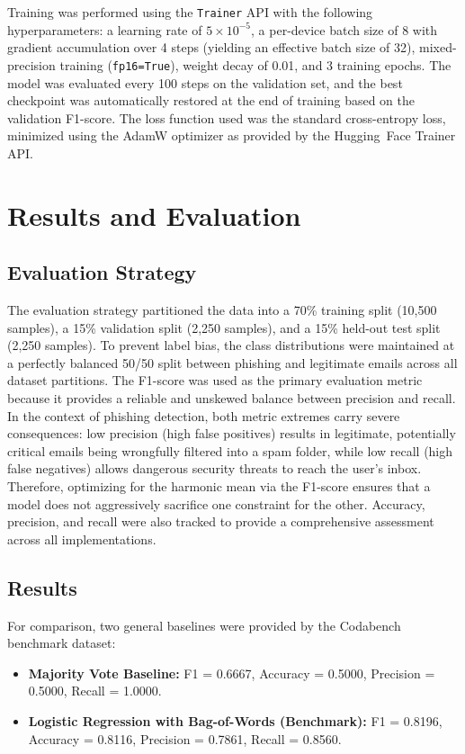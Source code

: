 \documentclass[11pt]{article}
\begin{document}
Training was performed using the \texttt{Trainer} API with the following hyperparameters: a learning rate of $5 \times 10^{-5}$, a per-device batch size of 8 with gradient accumulation over 4 steps (yielding an effective batch size of 32), mixed-precision training (\texttt{fp16=True}), weight decay of 0.01, and 3 training epochs. The model was evaluated every 100 steps on the validation set, and the best checkpoint was automatically restored at the end of training based on the validation F1-score. The loss function used was the standard cross-entropy loss, minimized using the AdamW optimizer as provided by the Hugging~Face Trainer API.

\section{Results and Evaluation}

\subsection{Evaluation Strategy}
The evaluation strategy partitioned the data into a 70\% training split (10,500 samples), a 15\% validation split (2,250 samples), and a 15\% held-out test split (2,250 samples). To prevent label bias, the class distributions were maintained at a perfectly balanced 50/50 split between phishing and legitimate emails across all dataset partitions. The F1-score was used as the primary evaluation metric because it provides a reliable and unskewed balance between precision and recall. In the context of phishing detection, both metric extremes carry severe consequences: low precision (high false positives) results in legitimate, potentially critical emails being wrongfully filtered into a spam folder, while low recall (high false negatives) allows dangerous security threats to reach the user's inbox. Therefore, optimizing for the harmonic mean via the F1-score ensures that a model does not aggressively sacrifice one constraint for the other. Accuracy, precision, and recall were also tracked to provide a comprehensive assessment across all implementations.

\subsection{Results}
For comparison, two general baselines were provided by the Codabench benchmark dataset:
\begin{itemize}
    \item \textbf{Majority Vote Baseline:} F1 = 0.6667, Accuracy = 0.5000, Precision = 0.5000, Recall = 1.0000.
    \item \textbf{Logistic Regression with Bag-of-Words (Benchmark):} F1 = 0.8196, Accuracy = 0.8116, Precision = 0.7861, Recall = 0.8560.
\end{itemize}
\end{document}
